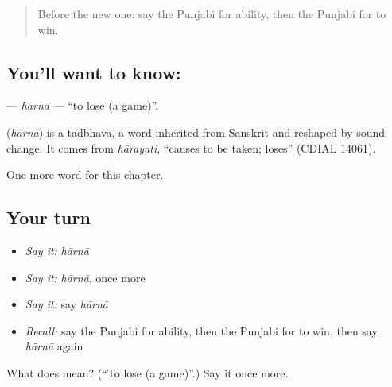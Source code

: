 \label{lesson:PA-C112-harna}



\begin{quote}
Before the new one: say the Punjabi for ability, then the Punjabi for to win.
\end{quote}

\subsection*{You'll want to know: }
\textbf{} — \emph{hārnā} — \textquotedblleft{}to lose (a game)\textquotedblright{}.

\begin{cousinweb}
\textbf{} (\emph{hārnā}) is a tadbhava, a word inherited from Sanskrit and reshaped by sound change. It comes from \emph{hārayati}, \textquotedblleft{}causes to be taken; loses\textquotedblright{} (CDIAL 14061).
\end{cousinweb}

\begin{grammarlens}[title={What you've built}]
One more word for this chapter.
\end{grammarlens}

\subsection*{Your turn}
\begin{itemize}
\raggedright
  \item \emph{Say it:} \emph{hārnā}
  \item \emph{Say it:} \emph{hārnā}, once more
  \item \emph{Say it:} say \emph{hārnā}
  \item \emph{Recall:} say the Punjabi for ability, then the Punjabi for to win, then say \emph{hārnā} again
\end{itemize}

\begin{tcolorbox}[breakable,colback=teal!4,colframe=teal!35!black,title={Before you move on}]
What does  mean? (\textquotedblleft{}To lose (a game)\textquotedblright{}.) Say it once more.
\end{tcolorbox}
